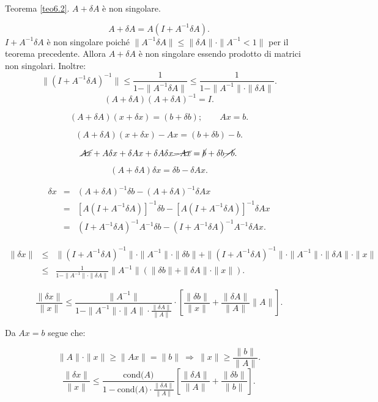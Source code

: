 \begin{dimo}Teorema \ref{teo6.2}.
$A + \delta A$ è non singolare.

\[A + \delta A = A(I + A^{-1} \delta A).\]
$I + A^{-1} \delta A$ è non singolare poiché $\|A^{-1}\delta A\| \leq \|\delta
A\|\cdot\|A^{-1}
< 1\|$ per il teorema precedente. Allora $A + \delta A$ è
non singolare essendo prodotto di matrici non singolari. Inoltre:
\[\|(I + A^{-1}\delta A)^{-1}\|\leq\frac{1}{1 - \|A^{-1}\delta A\|}
\leq \frac{1}{1 - \|A^{-1}\|\cdot\|\delta A\|}.\]
\[
(A + \delta A)(A + \delta A)^{-1} = I.
\]

\[(A + \delta A)(x + \delta x)=(b + \delta b); \qquad Ax = b.\]

\[ (A + \delta A)(x + \delta x) - Ax = (b + \delta b) -b.\]

\[ \cancel{Ax} + A\delta x + \delta Ax + \delta A\delta x
\cancel{- Ax} = \cancel{b} + \delta b \cancel{-b}.\]

\[(A + \delta A)\delta x = \delta b - \delta Ax.\]

\[
\begin{array}{lcl}
\delta x & = & (A + \delta A)^{-1}\delta b - (A + \delta A)^{-1}\delta Ax \\
         & = & [A(I + A^{-1}\delta A)]^{-1}\delta b -
               [A(I + A^{-1}\delta A)]^{-1}\delta Ax \\
         & = & (I + A^{-1}\delta A)^{-1}A^{-1}\delta b -
               (I + A^{-1}\delta A)^{-1}A^{-1}\delta Ax.
\end{array}\]

\[
\begin{array}{lcl}
\|\delta x\| & \leq & \|(I + A^{-1}\delta A)^{-1}\|\cdot \|A^{-1}\| \cdot
               \|\delta b\| + \|(I + A^{-1}\delta A)^{-1}\| \cdot \|A^{-1}\|
               \cdot \|\delta A\|\cdot\|x\|  \\
             & \leq & \frac{1}{1 - \|A^{-1}\|\cdot\|\delta A\|} \|A^{-1}\|
             (\|\delta b\| + \|\delta A\|\cdot\|x\|).
\end{array}
\]

\[
\frac{\|\delta x\|}{\|x\|} \leq
\frac{\|A^{-1}\|}{1 - \|A^{-1}\|\cdot\|A\|\cdot \frac{\|\delta A\|}{\|A\|}}
\cdot \left[ \frac{\|\delta b\|}{\|x\|} + \frac{\|\delta A\|}{\|A\|}
\|A\|\right].
\]

Da $Ax = b$ segue che:

\[\|A\|\cdot \|x\| \geq \|Ax\| = \|b\| \ \Rightarrow \ \|x\| \geq
\frac{\|b\|}{\|A\|}.\]
\[\frac{\|\delta x\|}{\|x\|} \leq \frac{\textrm{cond(}A\textrm{)}}
{1 -\textrm{cond(}A\textrm{)}
\cdot  \frac{\|\delta A\|}{\|A\|}}
\left[\frac{\|\delta A\|}{\|A\|} + \frac{\|\delta b\|}{\|b\|}\right].\]
\end{dimo}

